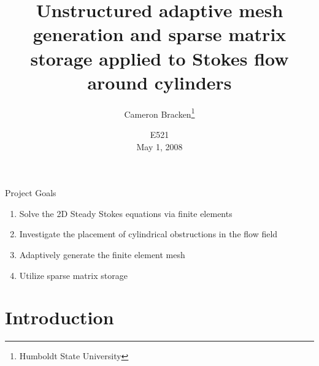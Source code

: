 \documentclass[compress]{beamer}
\title{Unstructured adaptive mesh generation and sparse matrix storage applied to Stokes flow around cylinders}
\author{Cameron Bracken\footnote{Humboldt State University}}
\date{E521\\May 1, 2008}
\newcommand{\attrib}[1]{%
\nopagebreak{\raggedleft\footnotesize #1\par}}
\begin{document}
\begin{frame}
\titlepage
\end{frame}

\begin{frame}{Project Goals}
\begin{enumerate}
\item Solve the 2D Steady Stokes equations via finite elements
\item Investigate the placement of cylindrical obstructions in the flow field
\item Adaptively generate the finite element mesh
\item Utilize sparse matrix storage
\end{enumerate}
\end{frame}

\section{Introduction}
\end{document}
